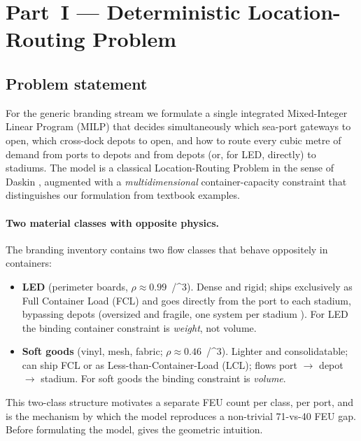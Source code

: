 \documentclass[11pt,a4paper]{article}
\numberwithin{equation}{section}
\newcommand{\mcube}{\text{m}^{3}}
\newcommand{\tonne}{\text{t}}
\begin{document}
\section{Part~I — Deterministic Location-Routing Problem}\label{sec:partI}

\subsection{Problem statement}

For the generic branding stream we formulate a single integrated Mixed-Integer Linear Program (MILP) that decides simultaneously which sea-port gateways to open, which cross-dock depots to open, and how to route every cubic metre of demand from ports to depots and from depots (or, for LED, directly) to stadiums. The model is a classical Location-Routing Problem in the sense of Daskin \cite{daskin_location}, augmented with a \emph{multidimensional} container-capacity constraint that distinguishes our formulation from textbook examples.

\paragraph{Two material classes with opposite physics.} The branding inventory contains two flow classes that behave oppositely in containers:

\begin{itemize}[leftmargin=*,itemsep=3pt,topsep=2pt]
\item \textbf{LED} (perimeter boards, $\rho \approx 0.99$~\tonne/\mcube). Dense and rigid; ships exclusively as Full Container Load (FCL) and goes directly from the port to each stadium, bypassing depots (oversized and fragile, one system per stadium \cite{jyvisions_led}). For LED the binding container constraint is \emph{weight}, not volume.
\item \textbf{Soft goods} (vinyl, mesh, fabric; $\rho \approx 0.46$~\tonne/\mcube). Lighter and consolidatable; can ship FCL or as Less-than-Container-Load (LCL); flows port $\rightarrow$ depot $\rightarrow$ stadium. For soft goods the binding constraint is \emph{volume}.
\end{itemize}

This two-class structure motivates a separate FEU count per class, per port, and is the mechanism by which the model reproduces a non-trivial 71-vs-40 FEU gap. Before formulating the model,  gives the geometric intuition.
\end{document}
